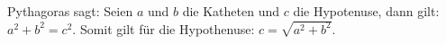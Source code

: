 Pythagoras sagt: Seien $a$ und $b$ die 
Katheten und $c$ die Hypotenuse, dann gilt: $a^2+b^2=c^2$. 
Somit gilt für die Hypothenuse: $c=\sqrt{a^2+b^2}$.

